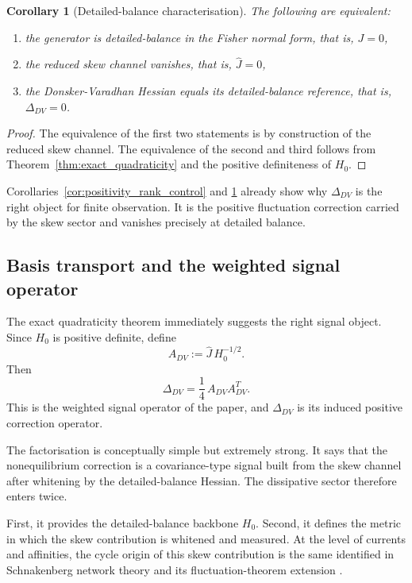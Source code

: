\documentclass[11pt,a4paper]{article}
\numberwithin{equation}{section}
\theoremstyle{thmcompact}
\newtheorem{corollary}[theorem]{Corollary}
\theoremstyle{remark}
\begin{document}
\begin{corollary}[Detailed-balance characterisation]
\label{cor:db_characterisation}
The following are equivalent:
\begin{enumerate}
\item the generator is detailed-balance in the Fisher normal form, that is, \(J=0\),
\item the reduced skew channel vanishes, that is, \(\widehat J=0\),
\item the Donsker-Varadhan Hessian equals its detailed-balance reference, that is, \(\Delta_{DV}=0\).
\end{enumerate}
\end{corollary}

\begin{proof}
The equivalence of the first two statements is by construction of the reduced skew channel. The equivalence of the second and third follows from Theorem~\ref{thm:exact_quadraticity} and the positive definiteness of \(H_0\).
\end{proof}

Corollaries~\ref{cor:positivity_rank_control} and \ref{cor:db_characterisation} already show why \(\Delta_{DV}\) is the right object for finite observation. It is the positive fluctuation correction carried by the skew sector and vanishes precisely at detailed balance.

\subsection{Basis transport and the weighted signal operator}

The exact quadraticity theorem immediately suggests the right signal object. Since \(H_0\) is positive definite, define
\begin{equation}
A_{DV}:=\widehat J\,H_0^{-1/2}.
\end{equation}
Then
\begin{equation}
\Delta_{DV}=\frac14\,A_{DV}A_{DV}^{T}.
\end{equation}
This is the weighted signal operator of the paper, and \(\Delta_{DV}\) is its induced positive correction operator.

The factorisation is conceptually simple but extremely strong. It says that the nonequilibrium correction is a covariance-type signal built from the skew channel after whitening by the detailed-balance Hessian. The dissipative sector therefore enters twice.

First, it provides the detailed-balance backbone \(H_0\). Second, it defines the metric in which the skew contribution is whitened and measured. At the level of currents and affinities, the cycle origin of this skew contribution is the same identified in Schnakenberg network theory and its fluctuation-theorem extension \cite{Schnakenberg1976,AndrieuxGaspard2007}.
\end{document}
